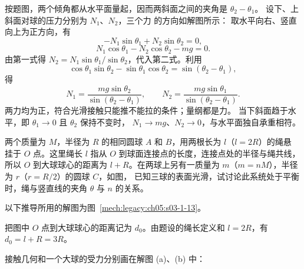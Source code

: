 {\begin{xesolution}
按题图，两个倾角都从水平面量起，因而两斜面之间的夹角是 $\theta_2-\theta_1$。
设下、上斜面对球的压力分别为 $N_1$、$N_2$，三个力
的方向如解图所示：
\soldiagOneTwelve
取水平向右、竖直向上为正方向，有
\[
  -N_1\sin\theta_1+N_2\sin\theta_2=0,
\]
\[
  N_1\cos\theta_1-N_2\cos\theta_2-mg=0.
\]
由第一式得 $N_2=N_1\sin\theta_1/\sin\theta_2$，代入第二式。利用
\[
 \cos\theta_1\sin\theta_2-\sin\theta_1\cos\theta_2=\sin(\theta_2-\theta_1),
\]
得
\[
  \boxed{N_1=\frac{mg\sin\theta_2}{\sin(\theta_2-\theta_1)}},
  \qquad
  \boxed{N_2=\frac{mg\sin\theta_1}{\sin(\theta_2-\theta_1)}}.
\]
两力均为正，符合光滑接触只能推不能拉的条件；量纲都是力。
当下斜面趋于水平，即 $\theta_1\to0$ 且 $\theta_2$ 保持不变时，
$N_1\to mg$、$N_2\to0$，与水平面独自承重相符。
\end{xesolution}

\begin{origexamplebox}{}\label{ch05:ex:s03-1-13}
两个质量为 $M$，半径为 $R$ 的相同圆球 $A$ 和 $B$，用两根长为 $l$（$l=2R$）的绳悬
挂于 $O$ 点。这里绳长 $l$ 指从 $O$ 到球面连接点的长度，连接点处的半径与绳共线，
所以 $O$ 到大球球心的距离为 $l+R$。在两球上另有一质量为 $m$（$m=nM$），半径为
$r$（$r=R/2$）的圆球 $C$，如图，
已知三球的表面光滑，试讨论此系统处于平衡时，绳与竖直线的夹角 $\theta$ 与 $n$ 的关系。
\end{origexamplebox}

\begin{xesolution}
以下推导所用的解图为图~\ref{mech:legacy:ch05:s03-1-13}。

把图中 $O$ 点到大球球心的距离记为 $d_0$。由题设的绳长定义和 $l=2R$，有
$d_0=l+R=3R$。

接触几何和一个大球的受力分别画在解图 (a)、(b) 中：
\soldiagOneThirteen


\end{xesolution}}
